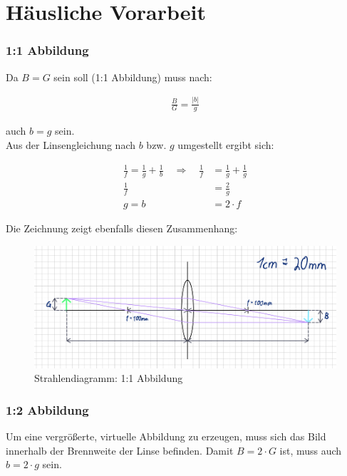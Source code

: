 \documentclass[a4paper]{scrartcl}
\numberwithin{equation}{subsection}
\begin{document}
\newpage
\section{Häusliche Vorarbeit}

\subsubsection{1:1 Abbildung}

Da $B = G$ sein soll (1:1 Abbildung) muss nach:

\begin{align*}
\frac{B}{G} = \frac{\vert b \vert}{g}
\end{align*}

auch $b=g$ sein.\\

Aus der Linsengleichung nach $b$ bzw. $g$ umgestellt ergibt sich:

\begin{align*}
\frac{1}{f} = \frac{1}{g} + \frac{1}{b} \quad \Rightarrow \quad \frac{1}{f} &= \frac{1}{g} + \frac{1}{g} \\
\frac{1}{f} &= \frac{2}{g} \\
g = b &= 2 \cdot f
\end{align*}

Die Zeichnung zeigt ebenfalls diesen Zusammenhang:

\begin{figure}[H]
\includegraphics[width=12cm]{Abbildungen/zeichnung_linse}
\centering
\caption{Strahlendiagramm: 1:1 Abbildung}
\centering
\label{fig:zeichnung_linse}
\end{figure}

\subsubsection{1:2 Abbildung}

Um eine vergrößerte, virtuelle Abbildung zu erzeugen, muss sich das Bild innerhalb der Brennweite der Linse befinden.
Damit $B = 2 \cdot G$ ist, muss auch $b = 2 \cdot g$ sein.
\end{document}
